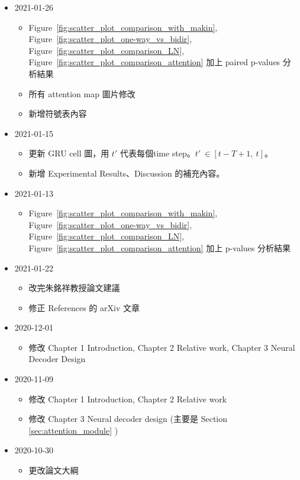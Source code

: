 \begin{itemize}
    \item 2021-01-26
        \begin{itemize}
            \item Figure~\ref{fig:scatter_plot_comparison_with_makin}, Figure~\ref{fig:scatter_plot_one-way_vs_bidir}, Figure~\ref{fig:scatter_plot_comparison_LN}, Figure~\ref{fig:scatter_plot_comparison_attention} 加上 paired p-values 分析結果
            \item 所有 attention map 圖片修改
            \item 新增符號表內容
        \end{itemize}
    \item 2021-01-15
        \begin{itemize}
            \item 更新 GRU cell 圖，用 $t'$ 代表每個time step。$t' \ \in [t-T+1, \ t]$。
            \item 新增 Experimental Results、Discussion 的補充內容。
        \end{itemize}
    \item 2021-01-13
        \begin{itemize}
            \item Figure~\ref{fig:scatter_plot_comparison_with_makin}, Figure~\ref{fig:scatter_plot_one-way_vs_bidir}, Figure~\ref{fig:scatter_plot_comparison_LN}, Figure~\ref{fig:scatter_plot_comparison_attention} 加上 p-values 分析結果
        \end{itemize}
    \item 2021-01-22
        \begin{itemize}
            \item 改完朱銘祥教授論文建議
            \item 修正 References 的 arXiv 文章
        \end{itemize}
    \item 2020-12-01
        \begin{itemize}
            \item 修改 Chapter 1 Introduction, Chapter 2 Relative work, Chapter 3 Neural Decoder Design
        \end{itemize}
    \item 2020-11-09
        \begin{itemize}
            \item 修改 Chapter 1 Introduction, Chapter 2 Relative work
            \item 修改 Chapter 3 Neural decoder design (主要是 Section \ref{sec:attention_module} )
        \end{itemize}
    \item 2020-10-30
        \begin{itemize}
        \item 更改論文大綱
        \end{itemize}
\end{itemize}
